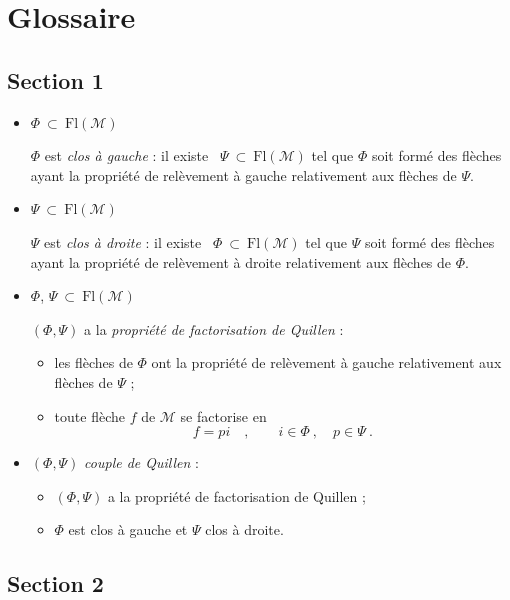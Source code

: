 \documentclass[11pt]{article}
\newcommand{\printedpage}[1]{\marginpar{\footnotesize p.~#1}}
\newcommand{\Fl}{\mathrm{Fl}}
\begin{document}
\clearpage

\printedpage{58}

\setcounter{footnote}{0}
\renewcommand{\thefootnote}{\fnsymbol{footnote}}
\section*{Glossaire}

\subsection*{Section 1}

\begin{itemize}
\item $\Phi \ \subset\ \Fl(\mathcal{M})$

$\Phi$ est \textit{clos à gauche} : il existe \ $\Psi \ \subset\ \Fl(\mathcal{M})$ tel que $\Phi$ soit formé des flèches ayant la propriété de relèvement à gauche relativement aux flèches de $\Psi$.

\item $\Psi \ \subset\ \Fl(\mathcal{M})$

$\Psi$ est \textit{clos à droite} : il existe \ $\Phi \ \subset\ \Fl(\mathcal{M})$ tel que $\Psi$ soit formé des flèches ayant la propriété de relèvement à droite relativement aux flèches de $\Phi$.

\item $\Phi$, $\Psi \ \subset\ \Fl(\mathcal{M})$

$(\Phi, \Psi)$ a la \textit{propriété de factorisation de Quillen} :
\begin{itemize}
\item[a)] les flèches de $\Phi$ ont la propriété de relèvement à gauche relativement aux flèches de $\Psi$ ;
\item[b)] toute flèche $f$ de $\mathcal{M}$ se factorise en
\[
f = pi \quad , \qquad i \in \Phi \ , \quad p \in \Psi \ .
\]
\end{itemize}

\item $(\Phi, \Psi)$ \textit{couple de Quillen} :
\begin{itemize}
\item[a)] $(\Phi, \Psi)$ a la propriété de factorisation de Quillen ;
\item[b)] $\Phi$ est clos à gauche et $\Psi$ clos à droite.
\end{itemize}
\end{itemize}

\subsection*{Section 2}
\end{document}

